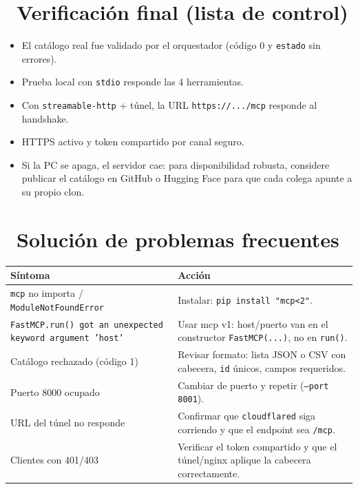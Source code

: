 \documentclass[11pt,a4paper]{article}
\newcommand{\iconotexto}[2]{\textcolor{cyanNeon}{\faIcon{#1}}~#2}
\begin{document}
\section{\iconotexto{clipboard-check}{Verificaci\'on final (lista de control)}}

\begin{tcolorbox}[tarjetaDato, title={\faIcon{check-double}~Checklist antes de distribuir la URL}]
\begin{itemize}[leftmargin=1.6em, itemsep=3pt]
  \item El cat\'alogo real fue validado por el orquestador (c\'odigo 0 y \texttt{estado} sin errores).
  \item Prueba local con \texttt{stdio} responde las 4 herramientas.
  \item Con \texttt{streamable-http} + túnel, la URL \texttt{https://.../mcp} responde al handshake.
  \item HTTPS activo y token compartido por canal seguro.
  \item Si la PC se apaga, el servidor cae: para disponibilidad robusta, considere publicar el
        cat\'alogo en GitHub o Hugging Face para que cada colega apunte a su propio clon.
\end{itemize}
\end{tcolorbox}

\section{\iconotexto{wrench}{Soluci\'on de problemas frecuentes}}

\begin{tcolorbox}[tarjetaDato, title={\faIcon{exclamation-triangle}~Errores y acciones}]
\begin{tabularx}{\linewidth}{@{}p{7.2cm}X@{}}
\toprule
\textbf{S\'intoma} & \textbf{Acci\'on} \\
\midrule
\texttt{mcp} no importa / \texttt{ModuleNotFoundError} & Instalar: \texttt{pip install "mcp<2"}. \\
\texttt{FastMCP.run() got an unexpected keyword argument 'host'} & Usar mcp v1: host/puerto van en el
constructor \texttt{FastMCP(...)}, no en \texttt{run()}. \\
Cat\'alogo rechazado (c\'odigo 1) & Revisar formato: lista JSON o CSV con cabecera, \texttt{id}
\'unicos, campos requeridos. \\
Puerto 8000 ocupado & Cambiar de puerto y repetir (\texttt{--port 8001}). \\
URL del túnel no responde & Confirmar que \texttt{cloudflared} siga corriendo y que el endpoint sea
\texttt{/mcp}. \\
Clientes con 401/403 & Verificar el token compartido y que el túnel/nginx aplique la cabecera
correctamente. \\
\bottomrule
\end{tabularx}
\end{tcolorbox}
\end{document}
